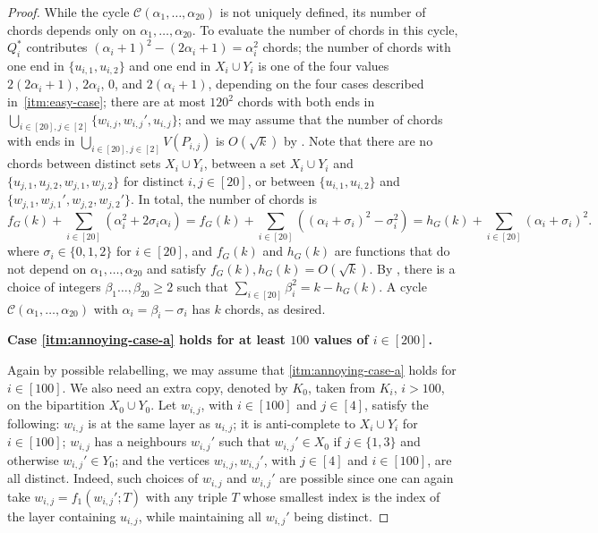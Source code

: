 \documentclass[10pt,a4paper]{amsart}
\theoremstyle{plain}
\theoremstyle{definition}
\newcommand{\C}{\mathcal{C}}
\begin{document}
\begin{proof}
        While the cycle $\C(\alpha_1, \ldots, \alpha_{20})$ is not uniquely defined, its number of chords depends only on $\alpha_1, \ldots, \alpha_{20}$. 
        To evaluate the number of chords in this cycle, $Q_i^*$ contributes $(\alpha_i + 1)^2 - (2\alpha_i + 1) = \alpha_i^2$ chords; the number of chords with one end in $\{u_{i, 1}, u_{i, 2}\}$ and one end in $X_i \cup Y_i$ is one of the four values $2(2\alpha_i + 1)$, $2\alpha_i$, $0$, and $2(\alpha_i + 1)$, depending on the four cases described in~\ref{itm:easy-case}; there are at most $120^2$ chords with both ends in $\bigcup_{i \in [20], j \in [2]} \{w_{i, j}, w_{i, j}', u_{i, j}\}$; and we may assume that the number of chords with ends in $\bigcup_{i \in [20], j \in [2]} V(P_{i,j})$ is $O(\sqrt{k})$ by . Note that there are no chords between distinct sets $X_i \cup Y_i$, between a set $X_i \cup Y_i$ and $\{u_{j,1}, u_{j,2}, w_{j, 1}, w_{j, 2}\}$ for distinct $i, j \in [20]$, or between $\{u_{i,1}, u_{i, 2}\}$ and $\{w_{j, 1}, w_{j,1}', w_{j,2}, w_{j,2}'\}$.  In total, the number of chords is 
        \begin{equation*}
            f_G(k) + \sum_{i \in [20]} (\alpha_i^2 + 2\sigma_i \alpha_i) 
            = f_G(k) + \sum_{i \in [20]} \left((\alpha_i + \sigma_i)^2 - \sigma_i^2\right) 
            = h_G(k) + \sum_{i \in [20]} (\alpha_i + \sigma_i)^2.
        \end{equation*}
        where $\sigma_i \in \{0, 1, 2\}$ for $i \in [20]$, and $f_G(k)$ and $h_G(k)$ are functions that do not depend on $\alpha_1, \ldots, \alpha_{20}$ and satisfy $f_G(k), h_G(k) = O(\sqrt{k})$. By , there is a choice of integers $\beta_1 \ldots, \beta_{20} \ge 2$ such that $\sum_{i \in [20]} \beta_i^2 = k - h_G(k)$. A cycle $\C(\alpha_1, \ldots, \alpha_{20})$ with $\alpha_i = \beta_i - \sigma_i$ has $k$ chords, as desired.
        
        \medskip
        
        \textbf{Case \ref{itm:annoying-case-a} holds for at least $100$ values of $i \in [200]$.}
        
        Again by possible relabelling, we may assume that \ref{itm:annoying-case-a} holds for $i \in [100]$.
        We also need an extra copy, denoted by $K_0$, taken from $K_i$, $i>100$, on the bipartition $X_0\cup Y_0$.
        Let $w_{i, j}$, with $i \in [100]$ and $j \in [4]$, satisfy the following: $w_{i, j}$ is at the same layer as $u_{i, j}$; it is anti-complete to $X_i \cup Y_i$ for $i \in [100]$; $w_{i, j}$ has a neighbours $w_{i, j}'$ such that $w_{i, j}' \in X_0$ if $j \in \{1, 3\}$ and otherwise $w_{i, j}' \in Y_0$; and the vertices $w_{i, j}, w_{i, j}'$, with $j \in [4]$ and $i \in [100]$, are all distinct. 
        Indeed, such choices of $w_{i,j}$ and $w_{i,j}'$ are possible since one can again take $w_{i,j}=f_1(w_{i,j}';T)$ with any triple $T$ whose smallest index is the index of the layer containing $u_{i,j}$, while maintaining all $w_{i,j}'$ being distinct.
        

\end{proof}
\end{document}
